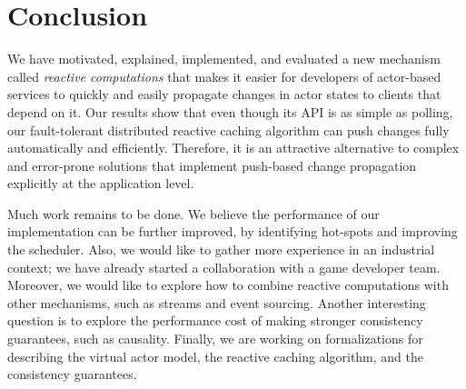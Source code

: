 \section{Conclusion}

We have motivated, explained, implemented, and evaluated a new mechanism called \emph{reactive computations} that makes it easier for developers of actor-based services to quickly and easily propagate changes in actor states to clients that depend on it. Our results show that even though its API is as simple as polling, our fault-tolerant distributed reactive caching algorithm can push changes fully automatically and efficiently. Therefore, it is an attractive alternative to complex and error-prone solutions that implement push-based change propagation explicitly at the application level. 

Much work remains to be done. We believe the performance of our implementation can be further improved, by identifying hot-spots and improving the scheduler. Also, we would like to gather more experience in an industrial context; we have already started a collaboration with a game developer team. Moreover, we would like to explore how to combine reactive computations with other mechanisms, such as streams and event sourcing. Another interesting question is to explore the performance cost of making stronger consistency guarantees, such as causality. Finally, we are working on formalizations for describing the virtual actor model, the reactive caching algorithm, and the consistency guarantees.